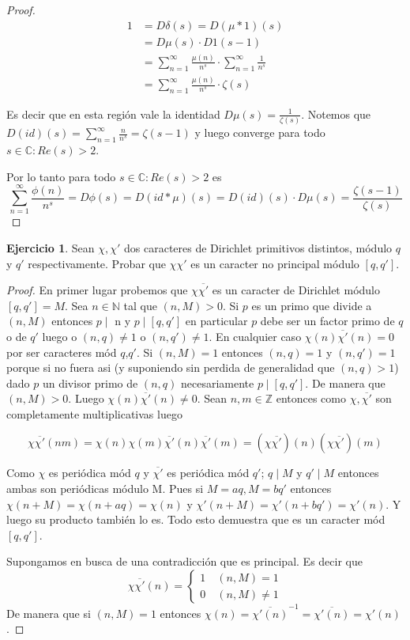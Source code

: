 \documentclass[12pt, a4paper]{article}
\newcommand{\naturales}{\mathbb{N}}
\newcommand{\enteros}{\mathbb{Z}}
\newcommand{\complejos}{\mathbb{C}}
\newcommand{\conj}[1]{\overline{#1}}
\theoremstyle{plain}
\theoremstyle{definition}
\newtheorem*{exercise}{Ejercicio}
\theoremstyle{remark}
\begin{document}
\begin{proof}
\begin{align*}
1 &= D\delta(s) = D(\mu*1)(s)\\ 
&= D\mu(s)\cdot D1(s-1) \\
&= \sum_{n=1}^{\infty}\frac{\mu(n)}{n^{s}} \cdot \sum_{n=1}^{\infty}\frac{1}{n^{s}} \\
&= \sum_{n=1}^{\infty}\frac{\mu(n)}{n^{s}} \cdot \zeta(s)
\end{align*}

Es decir que en esta región vale la identidad $D\mu(s) = \frac{1}{\zeta(s)}$. 
Notemos que $D(id)(s) = \sum_{n=1}^{\infty}\frac{n}{n^{s}} = \zeta(s-1)$ y luego converge para todo $s\in\complejos : Re(s)>2$.

Por lo tanto para todo $s\in\complejos : Re(s)>2$ es
\[
\sum_{n = 1}^{\infty}\frac{\phi(n)}{n^{s}} = D\phi(s) = D(id * \mu)(s) = D(id)(s) \cdot D\mu(s) = \frac{\zeta(s-1)}{\zeta(s)}
\]
\end{proof}

\begin{exercise}
    Sean $\chi, \chi' $ dos caracteres de Dirichlet primitivos distintos, módulo $q$ y $q'$ respectivamente. Probar que $\chi\chi'$
    es un caracter no principal módulo $[q,q']$.
    
\end{exercise}

\begin{proof}
    En primer lugar probemos que $\chi\conj{\chi'}$ es un caracter de Dirichlet módulo $[q,q'] = M$. Sea $n\in\naturales$ tal que $(n,M) > 0$. 
    Si $p$ es un primo que divide a $(n,M)$ entonces $p\mid$ n y $p\mid [q,q']$ en particular $p$ debe ser un factor primo de $q$ o de $q'$ luego o $(n,q) \neq 1$ o $(n,q') \neq 1$.
    En cualquier caso $\chi(n)\conj{\chi'}(n) = 0$ por ser caracteres mód $q$,$q'$.
    Si $(n,M) = 1$ entonces $(n,q) = 1$ y $(n,q') = 1$ porque si no fuera asi (y suponiendo sin perdida de generalidad que $(n,q)>1$) dado $p$ un
    divisor primo de $(n,q)$ necesariamente $p \mid [q,q']$. De manera que $(n,M) > 0$.
    Luego $\chi(n)\conj{\chi'}(n) \neq 0$.
    Sean $n,m \in \enteros$ entonces como $\chi,\conj{\chi'}$ son completamente multiplicativas luego

    \[
    \chi\conj{\chi'}(nm) = \chi(n)\chi(m)\conj{\chi'}(n)\conj{\chi'}(m) = (\chi\conj{\chi'})(n)(\chi\conj{\chi'})(m)
    \]

    Como $\chi$ es periódica mód $q$ y $\conj{\chi'}$ es periódica mód $q'$; $q \mid M$ y $q' \mid M$ entonces ambas son periódicas módulo M.
    Pues si $M = aq, M = bq'$ entonces $\chi(n + M) = \chi(n + aq) = \chi(n)$ y $\chi'(n + M) = \chi'(n + bq') = \chi'(n)$.
    Y luego su producto también lo es. Todo esto demuestra que es un caracter mód $[q,q']$.

    Supongamos en busca de una contradicción que es principal. Es decir que 
    \[
    \chi\conj{\chi'}(n) = 
    \begin{cases}
        1 \quad (n,M) = 1\\
        0 \quad (n,M) \neq 1
    \end{cases} 
    \]
    De manera que si $(n,M) = 1$ entonces $\chi(n) = \conj{\chi'(n)}^{-1} = \conj{\chi'(n)} = \chi'(n)$. 
\end{proof}
\end{document}
